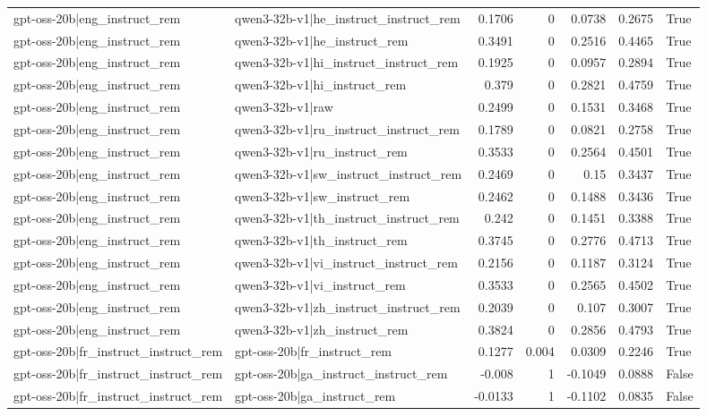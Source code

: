 \begin{table}
\begin{tabular}{l l r r r r l}
gpt-oss-20b|eng_instruct_rem & qwen3-32b-v1|he_instruct_instruct_rem & 0.1706 & 0 & 0.0738 & 0.2675 & True \\
gpt-oss-20b|eng_instruct_rem & qwen3-32b-v1|he_instruct_rem & 0.3491 & 0 & 0.2516 & 0.4465 & True \\
gpt-oss-20b|eng_instruct_rem & qwen3-32b-v1|hi_instruct_instruct_rem & 0.1925 & 0 & 0.0957 & 0.2894 & True \\
gpt-oss-20b|eng_instruct_rem & qwen3-32b-v1|hi_instruct_rem & 0.379 & 0 & 0.2821 & 0.4759 & True \\
gpt-oss-20b|eng_instruct_rem & qwen3-32b-v1|raw & 0.2499 & 0 & 0.1531 & 0.3468 & True \\
gpt-oss-20b|eng_instruct_rem & qwen3-32b-v1|ru_instruct_instruct_rem & 0.1789 & 0 & 0.0821 & 0.2758 & True \\
gpt-oss-20b|eng_instruct_rem & qwen3-32b-v1|ru_instruct_rem & 0.3533 & 0 & 0.2564 & 0.4501 & True \\
gpt-oss-20b|eng_instruct_rem & qwen3-32b-v1|sw_instruct_instruct_rem & 0.2469 & 0 & 0.15 & 0.3437 & True \\
gpt-oss-20b|eng_instruct_rem & qwen3-32b-v1|sw_instruct_rem & 0.2462 & 0 & 0.1488 & 0.3436 & True \\
gpt-oss-20b|eng_instruct_rem & qwen3-32b-v1|th_instruct_instruct_rem & 0.242 & 0 & 0.1451 & 0.3388 & True \\
gpt-oss-20b|eng_instruct_rem & qwen3-32b-v1|th_instruct_rem & 0.3745 & 0 & 0.2776 & 0.4713 & True \\
gpt-oss-20b|eng_instruct_rem & qwen3-32b-v1|vi_instruct_instruct_rem & 0.2156 & 0 & 0.1187 & 0.3124 & True \\
gpt-oss-20b|eng_instruct_rem & qwen3-32b-v1|vi_instruct_rem & 0.3533 & 0 & 0.2565 & 0.4502 & True \\
gpt-oss-20b|eng_instruct_rem & qwen3-32b-v1|zh_instruct_instruct_rem & 0.2039 & 0 & 0.107 & 0.3007 & True \\
gpt-oss-20b|eng_instruct_rem & qwen3-32b-v1|zh_instruct_rem & 0.3824 & 0 & 0.2856 & 0.4793 & True \\
gpt-oss-20b|fr_instruct_instruct_rem & gpt-oss-20b|fr_instruct_rem & 0.1277 & 0.004 & 0.0309 & 0.2246 & True \\
gpt-oss-20b|fr_instruct_instruct_rem & gpt-oss-20b|ga_instruct_instruct_rem & -0.008 & 1 & -0.1049 & 0.0888 & False \\
gpt-oss-20b|fr_instruct_instruct_rem & gpt-oss-20b|ga_instruct_rem & -0.0133 & 1 & -0.1102 & 0.0835 & False \\

\end{tabular}
\end{table}
